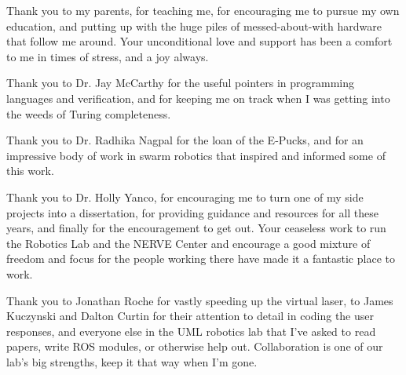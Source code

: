 Thank you to my parents, for teaching me, for encouraging me to pursue my own education, and putting up with the huge piles of messed-about-with hardware that follow me around. Your unconditional love and support has been a comfort to me in times of stress, and a joy always.

Thank you to Dr. Jay McCarthy for the useful pointers in programming languages and verification, and for keeping me on track when I was getting into the weeds of Turing completeness. 

Thank you to Dr. Radhika Nagpal for the loan of the E-Pucks, and for an impressive body of work in swarm robotics that inspired and informed some of this work. 

Thank you to Dr. Holly Yanco, for encouraging me to turn one of my side projects into a dissertation, for providing guidance and resources for all these years, and finally for the encouragement to get out. Your ceaseless work to run the Robotics Lab and the NERVE Center and encourage a good mixture of freedom and focus for the people working there have made it a fantastic place to work. 

Thank you to Jonathan Roche for vastly speeding up the virtual laser, to James Kuczynski and Dalton Curtin for their attention to detail in coding the user responses, and everyone else in the UML robotics lab that I've asked to read papers, write ROS modules, or otherwise help out. Collaboration is one of our lab's big strengths, keep it that way when I'm gone.  

